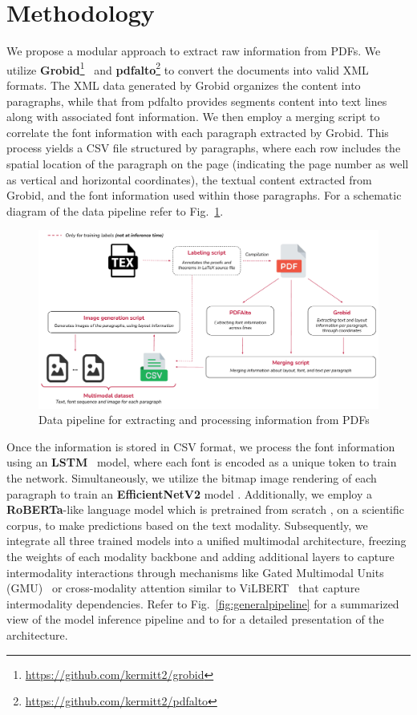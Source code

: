 \documentclass[runningheads]{llncs}
\begin{document}
\section{Methodology}
We propose a modular approach to extract raw information from PDFs. We
utilize
\textbf{Grobid}\footnote{\url{https://github.com/kermitt2/grobid}}~\cite{grobid}
and \textbf{pdfalto}\footnote{\url{https://github.com/kermitt2/pdfalto}} to convert
the documents into valid XML formats. The XML data generated by Grobid organizes the content into paragraphs,
while that from pdfalto provides segments content into text lines along with associated font information.
We then employ a merging script to correlate the font information with each paragraph extracted by Grobid.
This process yields a CSV file structured by paragraphs, where each row includes the spatial location of the
paragraph on the page (indicating the page number as well as vertical and horizontal coordinates), the textual content
extracted from Grobid, and the font information used within those
paragraphs. For a schematic diagram of the data pipeline
refer to Fig.~\ref{fig:datapipeline}.

\begin{figure}
	\centering
	\includegraphics[width=\textwidth]{images/preprocessing.pdf}
	\caption{Data pipeline for extracting and processing information from PDFs}
	\label{fig:datapipeline}
\end{figure}

Once the information is stored in CSV format, we process the font information using an \textbf{LSTM}~\cite{hochreiter1997long} model, where
each font is encoded as a unique token to train the network. Simultaneously, we utilize the bitmap image
rendering of each paragraph to train an \textbf{EfficientNetV2} model
\cite{tan2021efficientnetv2}. Additionally, we employ a \textbf{RoBERTa}-like language model which is pretrained from
scratch \cite{phdthesis},
on a scientific corpus, to make predictions based on the text modality. Subsequently, we
integrate all three trained models into a unified multimodal architecture, freezing the weights of each modality backbone and adding
additional layers to capture intermodality interactions through mechanisms like Gated Multimodal Units
(GMU)~\cite{arevalo2020gated} or cross-modality attention similar to
ViLBERT~\cite{lu2019vilbert} that capture intermodality dependencies.
Refer to Fig.~\ref{fig:generalpipeline} for a summarized view of the
model inference pipeline and to
\cite{mishra2024multimodal,phdthesis} for a detailed presentation of the
architecture.
\end{document}
